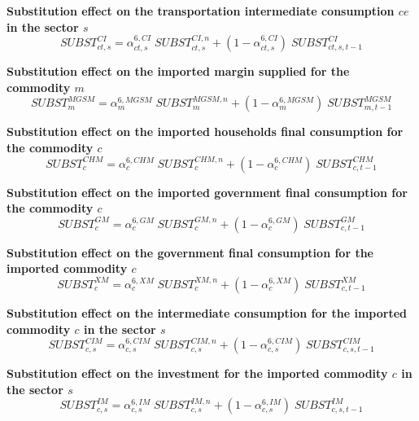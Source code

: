 \documentclass[12pt]{article}
\numberwithin{equation}{section}
\begin{document}
\noindent \textbf{Substitution effect on the transportation intermediate consumption $ce$ in the sector $s$} 
\begin{dmath}
SUBST^{CI}_{ct, s} = \alpha^{{6},CI}_{ct, s} \; SUBST^{CI,n}_{ct, s} + \left( 1 - \alpha^{{6},CI}_{ct, s} \right) \; SUBST^{CI}_{ct, s, t-1}
\label{adjustments.mdlSUBST_CI[ct, s]}
\end{dmath}

\noindent \textbf{Substitution effect on the imported margin supplied for the commodity $m$} 
\begin{dmath}
SUBST^{MGSM}_{m} = \alpha^{{6},MGSM}_{m} \; SUBST^{MGSM,n}_{m} + \left( 1 - \alpha^{{6},MGSM}_{m} \right) \; SUBST^{MGSM}_{m, t-1}
\label{adjustments.mdlSUBST_MGSM[m]}
\end{dmath}

\noindent \textbf{Substitution effect on the imported households final consumption for the commodity $c$} 
\begin{dmath}
SUBST^{CHM}_{c} = \alpha^{{6},CHM}_{c} \; SUBST^{CHM,n}_{c} + \left( 1 - \alpha^{{6},CHM}_{c} \right) \; SUBST^{CHM}_{c, t-1}
\label{adjustments.mdlSUBST_CHM[c]}
\end{dmath}

\noindent \textbf{Substitution effect on the imported government final consumption for the commodity $c$} 
\begin{dmath}
SUBST^{GM}_{c} = \alpha^{{6},GM}_{c} \; SUBST^{GM,n}_{c} + \left( 1 - \alpha^{{6},GM}_{c} \right) \; SUBST^{GM}_{c, t-1}
\label{adjustments.mdlSUBST_GM[c]}
\end{dmath}

\noindent \textbf{Substitution effect on the government final consumption for the imported commodity $c$} 
\begin{dmath}
SUBST^{XM}_{c} = \alpha^{{6},XM}_{c} \; SUBST^{XM,n}_{c} + \left( 1 - \alpha^{{6},XM}_{c} \right) \; SUBST^{XM}_{c, t-1}
\label{adjustments.mdlSUBST_XM[c]}
\end{dmath}

\noindent \textbf{Substitution effect on the intermediate consumption for the imported commodity $c$ in the sector $s$} 
\begin{dmath}
SUBST^{CIM}_{c, s} = \alpha^{{6},CIM}_{c, s} \; SUBST^{CIM,n}_{c, s} + \left( 1 - \alpha^{{6},CIM}_{c, s} \right) \; SUBST^{CIM}_{c, s, t-1}
\label{adjustments.mdlSUBST_CIM[c, s]}
\end{dmath}

\noindent \textbf{Substitution effect on the investment for the imported commodity $c$ in the sector $s$} 
\begin{dmath}
SUBST^{IM}_{c, s} = \alpha^{{6},IM}_{c, s} \; SUBST^{IM,n}_{c, s} + \left( 1 - \alpha^{{6},IM}_{c, s} \right) \; SUBST^{IM}_{c, s, t-1}
\label{adjustments.mdlSUBST_IM[c, s]}
\end{dmath}
\end{document}
